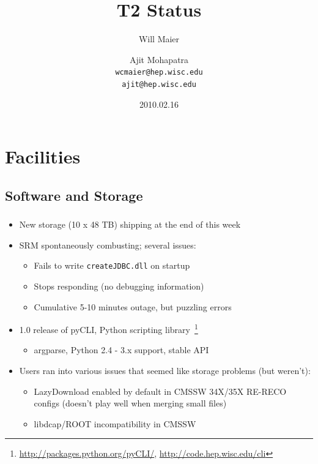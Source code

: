 \documentclass{beamer}
\title{T2 Status}
\author[Maier, Mohapatra]{
    Will Maier \and Ajit Mohapatra\\
    {\tt wcmaier@hep.wisc.edu}\\
    {\tt ajit@hep.wisc.edu}}
\institute[Wisconsin]{University of Wisconsin - High Energy Physics}
\date{2010.02.16}
\begin{document}
\begin{frame}
    \titlepage
\end{frame}


\section{Facilities}
\subsection{Software and Storage}
\begin{frame}
\frametitle{}

\begin{itemize}
	\item New storage (10 x 48 TB) shipping at the end of this week
	\item SRM spontaneously combusting; several issues:
	\begin{itemize}
		\item Fails to write {\tt createJDBC.dll} on startup
		\item Stops responding (no debugging information)
		\item Cumulative 5-10 minutes outage, but puzzling errors
	\end{itemize}
	\item 1.0 release of pyCLI, Python scripting library~\footnote{\url{http://packages.python.org/pyCLI/}, \url{http://code.hep.wisc.edu/cli}}
	\begin{itemize}
		\item argparse, Python 2.4 - 3.x support, stable API
	\end{itemize}
	\item Users ran into various issues that seemed like storage problems (but weren't):
	\begin{itemize}
		\item LazyDownload enabled by default in CMSSW 34X/35X RE-RECO configs (doesn't play well when merging small files)
		\item libdcap/ROOT incompatibility in CMSSW
	\end{itemize}
\end{itemize}
\end{frame}
\end{document}
